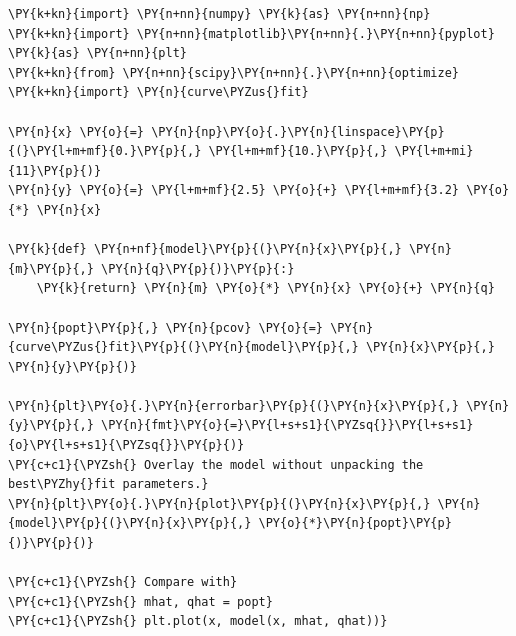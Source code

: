 \begin{Verbatim}[label=\makebox{\url{https://github.com/lucabaldini/cmepda/tree/master/slides/latex/snippets/func\_variadic\_fit.py}},commandchars=\\\{\}]
\PY{k+kn}{import} \PY{n+nn}{numpy} \PY{k}{as} \PY{n+nn}{np}
\PY{k+kn}{import} \PY{n+nn}{matplotlib}\PY{n+nn}{.}\PY{n+nn}{pyplot} \PY{k}{as} \PY{n+nn}{plt}
\PY{k+kn}{from} \PY{n+nn}{scipy}\PY{n+nn}{.}\PY{n+nn}{optimize} \PY{k+kn}{import} \PY{n}{curve\PYZus{}fit}

\PY{n}{x} \PY{o}{=} \PY{n}{np}\PY{o}{.}\PY{n}{linspace}\PY{p}{(}\PY{l+m+mf}{0.}\PY{p}{,} \PY{l+m+mf}{10.}\PY{p}{,} \PY{l+m+mi}{11}\PY{p}{)}
\PY{n}{y} \PY{o}{=} \PY{l+m+mf}{2.5} \PY{o}{+} \PY{l+m+mf}{3.2} \PY{o}{*} \PY{n}{x}

\PY{k}{def} \PY{n+nf}{model}\PY{p}{(}\PY{n}{x}\PY{p}{,} \PY{n}{m}\PY{p}{,} \PY{n}{q}\PY{p}{)}\PY{p}{:}
    \PY{k}{return} \PY{n}{m} \PY{o}{*} \PY{n}{x} \PY{o}{+} \PY{n}{q}

\PY{n}{popt}\PY{p}{,} \PY{n}{pcov} \PY{o}{=} \PY{n}{curve\PYZus{}fit}\PY{p}{(}\PY{n}{model}\PY{p}{,} \PY{n}{x}\PY{p}{,} \PY{n}{y}\PY{p}{)}

\PY{n}{plt}\PY{o}{.}\PY{n}{errorbar}\PY{p}{(}\PY{n}{x}\PY{p}{,} \PY{n}{y}\PY{p}{,} \PY{n}{fmt}\PY{o}{=}\PY{l+s+s1}{\PYZsq{}}\PY{l+s+s1}{o}\PY{l+s+s1}{\PYZsq{}}\PY{p}{)}
\PY{c+c1}{\PYZsh{} Overlay the model without unpacking the best\PYZhy{}fit parameters.}
\PY{n}{plt}\PY{o}{.}\PY{n}{plot}\PY{p}{(}\PY{n}{x}\PY{p}{,} \PY{n}{model}\PY{p}{(}\PY{n}{x}\PY{p}{,} \PY{o}{*}\PY{n}{popt}\PY{p}{)}\PY{p}{)}

\PY{c+c1}{\PYZsh{} Compare with}
\PY{c+c1}{\PYZsh{} mhat, qhat = popt}
\PY{c+c1}{\PYZsh{} plt.plot(x, model(x, mhat, qhat))}
\end{Verbatim}